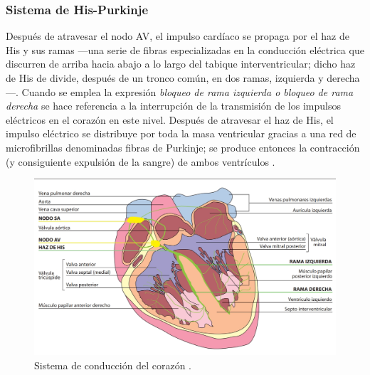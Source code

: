 \documentclass[spanish,11pt,letterpaper,oneside]{memoir}
\begin{document}
	\subsubsection{Sistema de His-Purkinje}
	Después de atravesar el nodo AV, el impulso cardíaco se propaga por el haz de His y sus ramas ---una serie de fibras especializadas en la conducción eléctrica que discurren de arriba hacia abajo a lo largo del tabique interventricular; dicho haz de His de divide, después de un tronco común, en dos ramas, izquierda y derecha---. Cuando se emplea la expresión \textit{bloqueo de rama izquierda o bloqueo de rama derecha} se hace referencia a la interrupción de la transmisión de los impulsos eléctricos en el corazón en este nivel. Después de atravesar el haz de His, el impulso eléctrico se distribuye por toda la masa ventricular gracias a una red de microfibrillas denominadas fibras de Purkinje; se produce entonces la contracción (y consiguiente expulsión de la sangre) de ambos ventrículos \cite{fbbva}.
	\begin{figure}[h]
		\centering
		\includegraphics[width=0.95\linewidth]{Sem_1/figuras/Sistema_de_conduccion_corazon.jpeg}
		\caption{Sistema de conducción del corazón \cite{fbbva}.}
		\label{fig:sis_cond_heart}
	\end{figure}
\end{document}
